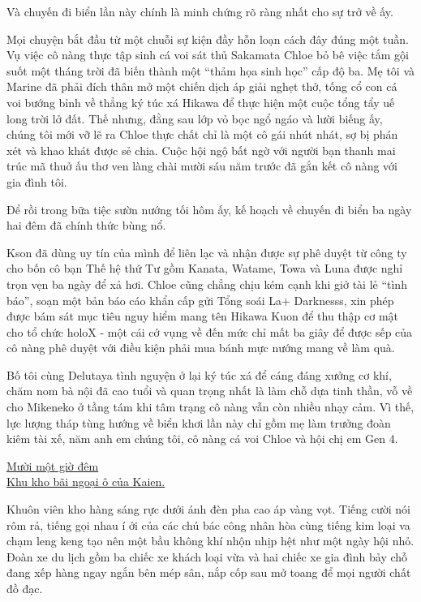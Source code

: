 \documentclass[../main.tex]{subfiles}
\begin{document}
Và chuyến đi biển lần này chính là minh chứng rõ ràng nhất cho sự trở về ấy.

Mọi chuyện bắt đầu từ một chuỗi sự kiện đầy hỗn loạn cách đây đúng một tuần. Vụ việc cô nàng thực tập sinh cá voi sát thủ Sakamata Chloe bỏ bê việc tắm gội suốt một tháng trời đã biến thành một ``thảm họa sinh học'' cấp độ ba. Mẹ tôi và Marine đã phải đích thân mở một chiến dịch áp giải nghẹt thở, tống cổ con cá voi bướng bỉnh về thẳng ký túc xá Hikawa để thực hiện một cuộc tổng tẩy uế long trời lở đất. Thế nhưng, đằng sau lớp vỏ bọc ngổ ngáo và lười biếng ấy, chúng tôi mới vỡ lẽ ra Chloe thực chất chỉ là một cô gái nhút nhát, sợ bị phán xét và khao khát được sẻ chia. Cuộc hội ngộ bất ngờ với người bạn thanh mai trúc mã thuở ấu thơ ven làng chài mười sáu năm trước đã gắn kết cô nàng với gia đình tôi.

Để rồi trong bữa tiệc sườn nướng tối hôm ấy, kế hoạch về chuyến đi biển ba ngày hai đêm đã chính thức bùng nổ.

Kson đã dùng uy tín của mình để liên lạc và nhận được sự phê duyệt từ công ty cho bốn cô bạn Thế hệ thứ Tư gồm Kanata, Watame, Towa và Luna được nghỉ trọn vẹn ba ngày để xả hơi. Chloe cũng chẳng chịu kém cạnh khi giở tài lẻ ``tình báo'', soạn một bản báo cáo khẩn cấp gửi Tổng soái La+ Darknesss, xin phép được bám sát mục tiêu nguy hiểm mang tên Hikawa Kuon để thu thập cơ mật cho tổ chức holoX - một cái cớ vụng về đến mức chỉ mất ba giây để được sếp của cô nàng phê duyệt với điều kiện phải mua bánh mực nướng mang về làm quà.

Bố tôi cùng Delutaya tình nguyện ở lại ký túc xá để cáng đáng xưởng cơ khí, chăm nom bà nội đã cao tuổi và quan trọng nhất là làm chỗ dựa tinh thần, vỗ về cho Mikeneko ở tầng tám khi tâm trạng cô nàng vẫn còn nhiều nhạy cảm. Vì thế, lực lượng tháp tùng hướng về biển khơi lần này chỉ gồm mẹ làm trưởng đoàn kiêm tài xế, năm anh em chúng tôi, cô nàng cá voi Chloe và hội chị em Gen 4.

\begin{center}
  \uline{Mười một giờ đêm\\Khu kho bãi ngoại ô của Kaien.}
\end{center}

Khuôn viên kho hàng sáng rực dưới ánh đèn pha cao áp vàng vọt. Tiếng cười nói rôm rả, tiếng gọi nhau í ới của các chú bác công nhân hòa cùng tiếng kim loại va chạm leng keng tạo nên một bầu không khí nhộn nhịp hệt như một ngày hội nhỏ. Đoàn xe du lịch gồm ba chiếc xe khách loại vừa và hai chiếc xe gia đình bảy chỗ đang xếp hàng ngay ngắn bên mép sân, nắp cốp sau mở toang để mọi người chất đồ đạc.
\end{document}

